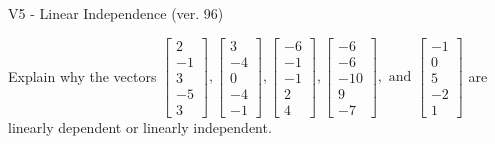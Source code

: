 \begin{exercise}
  \begin{exerciseTitle}V5 - Linear Independence (ver. 96)\end{exerciseTitle}
  \begin{exerciseStatement}
    Explain why the vectors \(\left[\begin{array}{r}
2 \\
-1 \\
3 \\
-5 \\
3
\end{array}\right] , \left[\begin{array}{r}
3 \\
-4 \\
0 \\
-4 \\
-1
\end{array}\right] , \left[\begin{array}{r}
-6 \\
-1 \\
-1 \\
2 \\
4
\end{array}\right] , \left[\begin{array}{r}
-6 \\
-6 \\
-10 \\
9 \\
-7
\end{array}\right] , \text{ and } \left[\begin{array}{r}
-1 \\
0 \\
5 \\
-2 \\
1
\end{array}\right]\) are linearly dependent or linearly independent.	



\end{exerciseStatement}
\end{exercise}
